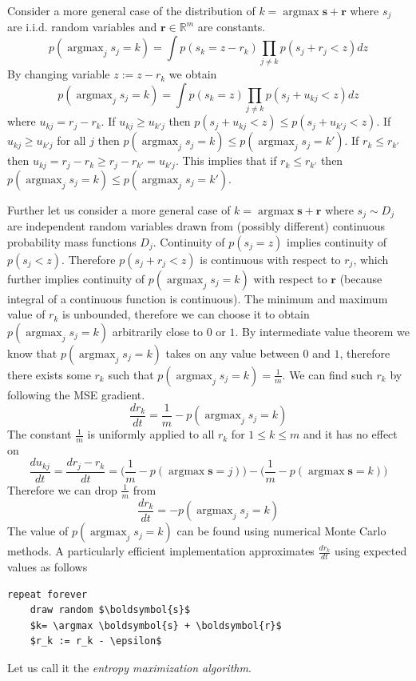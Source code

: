 \documentclass[12pt]{article}
\DeclareMathOperator*{\argmax}{argmax}
\begin{document}
Consider a more general case of the distribution of $k=\argmax \boldsymbol{s}+\boldsymbol{r}$ where $s_j$ are i.i.d. random variables and $\boldsymbol{r}\in \mathbb{R}^m$ are constants. 
\[
p(\argmax_j s_j=k) = \int p(s_k=z-r_k)\prod_{j\ne k} p(s_j+r_j< z) dz
\] 
By changing variable  $z := z-r_k$ we obtain
\[	
p(\argmax_j s_j=k) = \int  p(s_k=z) \prod_{j\ne k} p(s_j + u_{kj} < z) dz 
\]
where $u_{kj}=r_j-r_k$. If $u_{kj} \ge u_{k'j}$ then $p(s_j + u_{kj} < z) \le p(s_j + u_{k'j}< z)$. If $u_{kj} \ge u_{k'j}$  for all $j$ then $p(\argmax_j s_j=k) \le p(\argmax_j s_j=k')$. If $r_k \le r_{k'}$ then $u_{kj} = r_j-r_k \ge r_j-r_{k'} = u_{k'j}$. This implies that if $r_k \le r_{k'}$ then $p(\argmax_j s_j=k) \le p(\argmax_j s_j=k')$. 

Further let us consider a more general case of  $k=\argmax \boldsymbol{s}+\boldsymbol{r}$ where $s_j\sim D_j$ are independent random variables drawn from (possibly different) continuous probability mass functions $D_j$. Continuity of $p(s_j=z)$ implies continuity of $p(s_j < z)$. Therefore $p(s_j +r_j< z)$ is continuous with respect to $r_j$, which further implies continuity of  $p(\argmax_j s_j=k)$ with respect to $\boldsymbol{r}$ (because integral of a continuous function is continuous). The minimum and maximum value of $r_k$ is unbounded, therefore we can choose it to obtain $p(\argmax_j s_j=k)$ arbitrarily close to $0$ or $1$. By intermediate value theorem we know that $p(\argmax_j s_j=k)$ takes on any value between $0$ and $1$, therefore there exists some $r_k$ such that  $p(\argmax_j s_j=k)=\frac{1}{m}$. We can find such $r_k$ by following the MSE gradient.
\[
\frac{d r_k}{d t} = \frac{1}{m}-p(\argmax_j s_j=k)
\]
The constant $\frac{1}{m}$ is uniformly applied to all $r_k$ for $1 \le k \le m$ and it has no effect on 
\[
\frac{du_{kj}}{dt}=\frac{dr_j-r_k}{dt} = \big(\frac{1}{m}-p(\argmax \boldsymbol{s}=j)\big)-\big(\frac{1}{m}-p(\argmax \boldsymbol{s}=k)\big)
\]
Therefore we can drop $\frac{1}{m}$ from 
\[
\frac{d r_k}{d t} = -p(\argmax_j s_j=k)
\]
The value of $p(\argmax_j s_j=k)$ can be found using numerical Monte Carlo methods. A particularly efficient implementation approximates $\frac{d r_k}{d t}$ using expected values as follows
\begin{lstlisting}
repeat forever
    draw random $\boldsymbol{s}$
    $k= \argmax \boldsymbol{s} + \boldsymbol{r}$
    $r_k := r_k - \epsilon$ 
\end{lstlisting}
Let us call it the \textit{entropy maximization algorithm}. 
\end{document}
